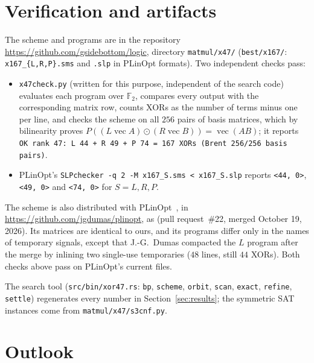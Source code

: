\documentclass[11pt]{article}
\theoremstyle{remark}
\newcommand{\F}{\mathbb{F}}
\begin{document}
\section{Verification and artifacts}

The scheme and programs are in the repository
\url{https://github.com/gsidebottom/logic}, directory
\texttt{matmul/x47/} (\texttt{best/x167/}: \texttt{x167\_\{L,R,P\}.sms}
and \texttt{.slp} in PLinOpt formats).  Two independent checks pass:
\begin{itemize}
\item \texttt{x47check.py} (written for this purpose, independent of
  the search code) evaluates each program over $\F_2$, compares every
  output with the corresponding matrix row, counts XORs as the number of
  terms minus one per line, and checks the scheme on all $256$ pairs of
  basis matrices, which by bilinearity proves
  $P((L\operatorname{vec}A)\odot(R\operatorname{vec}B))=\operatorname{vec}(AB)$;
  it reports \texttt{OK rank 47: L 44 + R 49 + P 74 = 167 XORs
  (Brent 256/256 basis pairs)}.
\item PLinOpt's \texttt{SLPchecker -q 2 -M x167\_S.sms < x167\_S.slp}
  reports \texttt{<44, 0>}, \texttt{<49, 0>} and \texttt{<74, 0>}
  for $S=L,R,P$.
\end{itemize}
The scheme is also distributed with PLinOpt~\cite{PLinOpt}, in
\url{https://github.com/jgdumas/plinopt}, as
 (pull request~\#22,
merged October 19, 2026).  Its matrices are identical to ours, and its
programs differ only in the names of temporary signals, except that
J.-G.~Dumas compacted the $L$ program after the merge by inlining two
single-use temporaries ($48$ lines, still $44$ XORs).  Both checks above
pass on PLinOpt's current files.

The search tool (\texttt{src/bin/xor47.rs}: \texttt{bp}, \texttt{scheme},
\texttt{orbit}, \texttt{scan}, \texttt{exact}, \texttt{refine},
\texttt{settle}) regenerates every number in
Section~\ref{sec:results}; the symmetric SAT instances come from
\texttt{matmul/x47/s3cnf.py}.

\section{Outlook}
\end{document}
